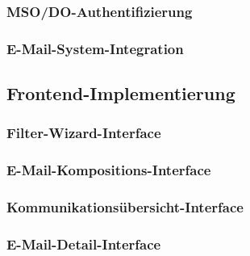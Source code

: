 \documentclass[11pt,a4paper]{article}
\begin{document}
\subsubsection{MSO/DO-Authentifizierung}

\subsubsection{E-Mail-System-Integration}

\subsection{Frontend-Implementierung}
\subsubsection{Filter-Wizard-Interface}

\subsubsection{E-Mail-Kompositions-Interface}

\subsubsection{Kommunikationsübersicht-Interface}


\subsubsection{E-Mail-Detail-Interface}
\end{document}
